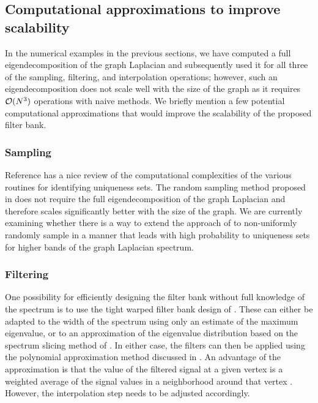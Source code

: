 \documentclass{article}
\begin{document}
\subsection{Computational approximations to improve scalability}
In the numerical examples in the previous sections, we have computed a full eigendecomposition of the graph Laplacian and subsequently used it for all three of the sampling, filtering, and interpolation operations; however, such an eigendecomposition does not scale well with the size of the graph as it requires ${\cal O}(N^3)$ operations with naive methods. We briefly mention a few potential computational approximations that would improve the scalability of the proposed filter bank.
\subsubsection{Sampling}

Reference \cite{anis2016efficient} has a nice review of the computational complexities of the various routines for identifying uniqueness sets.  The random sampling method proposed in \cite{PuyTGV15} does not require the full eigendecomposition of the graph Laplacian and therefore scales significantly better with the size of the graph.
We are currently examining whether there is a way to extend the approach of \cite{PuyTGV15} to non-uniformly randomly sample in a manner that leads with high probability to uniqueness sets for higher bands of the graph Laplacian spectrum.
 
\subsubsection{Filtering}\label{Se:filtering}
One possibility for efficiently designing the filter bank without full knowledge of the spectrum is to use the tight warped filter bank design of \cite{shuman2013spectrum}. These can either be adapted to the width of the spectrum using only an estimate of the maximum eigenvalue, or to an approximation of the eigenvalue distribution based on the spectrum slicing method of \cite[Section 3.3]{parlett}. In either case, the filters can then be applied using the polynomial approximation method discussed in \cite{hammond2011wavelets,shuman_DCOSS_2011}. An advantage of the approximation is that the value of the filtered signal at a given vertex is a weighted average of the signal values in a neighborhood around that vertex \cite{shuman2013emerging}. However, the interpolation step needs to be adjusted accordingly. 
\end{document}
